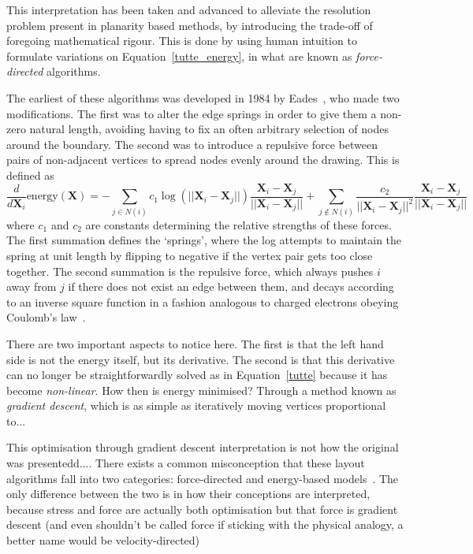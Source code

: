 This interpretation has been taken and advanced to alleviate the resolution problem present in planarity based methods, by introducing the trade-off of foregoing mathematical rigour. 
This is done by using human intuition to formulate variations on Equation~\eqref{tutte_energy}, in what are known as \emph{force-directed} algorithms.

The earliest of these algorithms was developed in 1984 by Eades~\cite{TODO}, who made two modifications. The first was to alter the edge springs in order to give them a non-zero natural length, avoiding having to fix an often arbitrary selection of nodes around the boundary. The second was to introduce a repulsive force between pairs of non-adjacent vertices to spread nodes evenly around the drawing.
This is defined as
\begin{equation}
    \frac{d}{d\mathbf{X}_i}\mathrm{energy}(\mathbf{X}) = -\sum_{j\in N(i)}c_1\log(||\mathbf{X}_i-\mathbf{X}_j||)\frac{\mathbf{X}_i-\mathbf{X}_j}{||\mathbf{X}_i-\mathbf{X}_j||}
    + \sum_{j\notin N(i)}\frac{c_2}{||\mathbf{X}_i-\mathbf{X}_j||^2}\frac{\mathbf{X}_i-\mathbf{X}_j}{||\mathbf{X}_i-\mathbf{X}_j||}
\end{equation}
where $c_1$ and $c_2$ are constants determining the relative strengths of these forces. The first summation defines the `springs', where the log attempts to maintain the spring at unit length by flipping to negative if the vertex pair gets too close together. The second summation is the repulsive force, which always pushes $i$ away from $j$ if there does not exist an edge between them, and decays according to an inverse square function in a fashion analogous to charged electrons obeying Coulomb's law~\cite{coulomb}.

There are two important aspects to notice here. The first is that the left hand side is not the energy itself, but its derivative. The second is that this derivative can no longer be straightforwardly solved as in Equation~\eqref{tutte} because it has become \emph{non-linear}. How then is energy minimised? Through a method known as \emph{gradient descent}, which is as simple as iteratively moving vertices proportional to...

This optimisation through gradient descent interpretation is not how the original was presentedd....
There exists a common misconception that these layout algorithms fall into two categories: force-directed and energy-based models~\cite{find some examples of this shit}. The only difference between the two is in how their conceptions are interpreted, because stress and force are actually both optimisation but that force is gradient descent (and even shouldn't be called force if sticking with the physical analogy, a better name would be velocity-directed)

